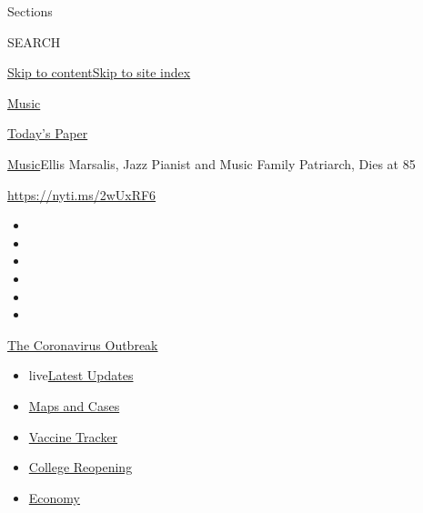 Sections

SEARCH

\protect\hyperlink{site-content}{Skip to
content}\protect\hyperlink{site-index}{Skip to site index}

\href{https://www.nytimes3xbfgragh.onion/section/arts/music}{Music}

\href{https://myaccount.nytimes3xbfgragh.onion/auth/login?response_type=cookie\&client_id=vi}{}

\href{https://www.nytimes3xbfgragh.onion/section/todayspaper}{Today's
Paper}

\href{/section/arts/music}{Music}\textbar{}Ellis Marsalis, Jazz Pianist
and Music Family Patriarch, Dies at 85

\url{https://nyti.ms/2wUxRF6}

\begin{itemize}
\item
\item
\item
\item
\item
\item
\end{itemize}

\href{https://www.nytimes3xbfgragh.onion/news-event/coronavirus?action=click\&pgtype=Article\&state=default\&region=TOP_BANNER\&context=storylines_menu}{The
Coronavirus Outbreak}

\begin{itemize}
\tightlist
\item
  live\href{https://www.nytimes3xbfgragh.onion/2020/08/04/world/coronavirus-covid-19.html?action=click\&pgtype=Article\&state=default\&region=TOP_BANNER\&context=storylines_menu}{Latest
  Updates}
\item
  \href{https://www.nytimes3xbfgragh.onion/interactive/2020/us/coronavirus-us-cases.html?action=click\&pgtype=Article\&state=default\&region=TOP_BANNER\&context=storylines_menu}{Maps
  and Cases}
\item
  \href{https://www.nytimes3xbfgragh.onion/interactive/2020/science/coronavirus-vaccine-tracker.html?action=click\&pgtype=Article\&state=default\&region=TOP_BANNER\&context=storylines_menu}{Vaccine
  Tracker}
\item
  \href{https://www.nytimes3xbfgragh.onion/2020/08/02/us/covid-college-reopening.html?action=click\&pgtype=Article\&state=default\&region=TOP_BANNER\&context=storylines_menu}{College
  Reopening}
\item
  \href{https://www.nytimes3xbfgragh.onion/live/2020/08/03/business/stock-market-today-coronavirus?action=click\&pgtype=Article\&state=default\&region=TOP_BANNER\&context=storylines_menu}{Economy}
\end{itemize}

